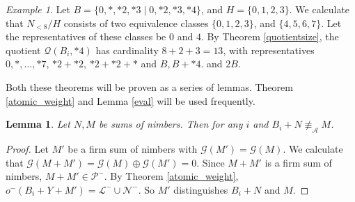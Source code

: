 \documentclass{amsart}
\theoremstyle{plain}
\newtheorem{lemma}[thm]{Lemma}
\theoremstyle{definition}
\theoremstyle{remark}
\newtheorem*{ex}{Example}
\numberwithin{equation}{section}
\numberwithin{thm}{section}
\begin{document}
\begin{ex}
   Let $B = \{0,*,*2,*3 \mid 0,*2,*3,*4\}$, and $H = \{0,1,2,3\}$. We calculate that $N_{<8}/ H$ consists of two equivalence classes $\{0,1,2,3\}$, and $\{4,5,6,7\}$. Let the representatives of these classes be $0$ and $4$. By Theorem \ref{quotientsize}, the quotient $\mathcal{Q}(B_i,*4)$ has cardinality $8+2+3 = 13$, with representatives $0,*,\dots,*7$, $*2+*2$, $*2+*2+*$ and $B ,B+*4$. and $2B$.
\end{ex}
Both these theorems will be proven as a series of lemmas. Theorem \ref{atomic_weight} and Lemma \ref{eval}
 will be used frequently.

\begin{lemma}
    \label{4}
   Let $N,M$ be sums of nimbers. Then for any $i$ and $B_i + N\not \equiv_{\mathscr{A}} M$.
\end{lemma}

\begin{proof}
    Let $M'$ be a firm sum of nimbers with $\mathcal{G}(M') = \mathcal{G}(M)$. We calculate that $\mathcal{G}(M+M') = \mathcal{G}(M)\oplus \mathcal{G}(M') = 0$. Since $M + M'$ is a firm sum of nimbers, $M+M' \in \mathcal{P}^-$.
    By Theorem \ref{atomic_weight}, $o^- (B_i + Y +M') = \mathcal{L}^- \cup \mathcal{N}^- $. So $M'$ distinguishes $B_i + N $ and $M$.
\end{proof}
\end{document}
